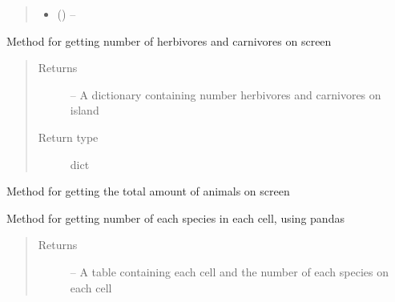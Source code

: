 \documentclass[a4paper,10pt,english]{sphinxmanual}
\begin{document}
\begin{fulllineitems}
\begin{fulllineitems}
\begin{quote}
\begin{description}
\begin{itemize}
\item {} 
 () -- 

\end{itemize}

\end{description}\end{quote}

\end{fulllineitems}


\begin{fulllineitems}
\label{\detokenize{simulation:biosim.simulation.BioSim.status_number_of_animals_by_species}}
Method for getting number of herbivores and carnivores on screen
\begin{quote}\begin{description}
\item[{Returns}] \leavevmode
{} -- A dictionary containing number herbivores and carnivores on island

\item[{Return type}] \leavevmode
dict

\end{description}\end{quote}

\end{fulllineitems}


\begin{fulllineitems}
\label{\detokenize{simulation:biosim.simulation.BioSim.status_number_of_animals_total}}
Method for getting the total amount of animals on screen

\end{fulllineitems}


\begin{fulllineitems}
\label{\detokenize{simulation:biosim.simulation.BioSim.status_per_cell_animal_count}}
Method for getting number of each species in each cell, using pandas
\begin{quote}\begin{description}
\item[{Returns}] \leavevmode
{} -- A table containing each cell and the number of each species on
each cell


\end{description}
\end{quote}
\end{fulllineitems}
\end{fulllineitems}
\end{document}
